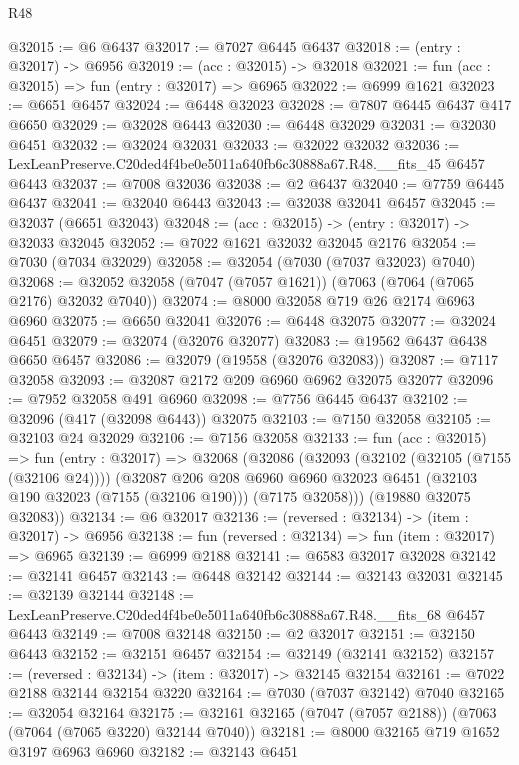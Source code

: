 \begin{lexlean}{R48}
\begin{coremodule}
@32015 := @6 @6437
@32017 := @7027 @6445 @6437
@32018 := (entry : @32017) -> @6956
@32019 := (acc : @32015) -> @32018
@32021 := fun (acc : @32015) => fun (entry : @32017) => @6965
@32022 := @6999 @1621
@32023 := @6651 @6457
@32024 := @6448 @32023
@32028 := @7807 @6445 @6437 @417 @6650
@32029 := @32028 @6443
@32030 := @6448 @32029
@32031 := @32030 @6451
@32032 := @32024 @32031
@32033 := @32022 @32032
@32036 := LexLeanPreserve.C20ded4f4be0e5011a640fb6c30888a67.R48.__fits_45 @6457 @6443
@32037 := @7008 @32036
@32038 := @2 @6437
@32040 := @7759 @6445 @6437
@32041 := @32040 @6443
@32043 := @32038 @32041 @6457
@32045 := @32037 (@6651 @32043)
@32048 := (acc : @32015) -> (entry : @32017) -> @32033 @32045
@32052 := @7022 @1621 @32032 @32045 @2176
@32054 := @7030 (@7034 @32029)
@32058 := @32054 (@7030 (@7037 @32023) @7040)
@32068 := @32052 @32058 (@7047 (@7057 @1621)) (@7063 (@7064 (@7065 @2176) @32032 @7040))
@32074 := @8000 @32058 @719 @26 @2174 @6963 @6960
@32075 := @6650 @32041
@32076 := @6448 @32075
@32077 := @32024 @6451
@32079 := @32074 (@32076 @32077)
@32083 := @19562 @6437 @6438 @6650 @6457
@32086 := @32079 (@19558 (@32076 @32083))
@32087 := @7117 @32058
@32093 := @32087 @2172 @209 @6960 @6962 @32075 @32077
@32096 := @7952 @32058 @491 @6960
@32098 := @7756 @6445 @6437
@32102 := @32096 (@417 (@32098 @6443)) @32075
@32103 := @7150 @32058
@32105 := @32103 @24 @32029
@32106 := @7156 @32058
@32133 := fun (acc : @32015) =>
  fun (entry : @32017) =>
  @32068
    (@32086
      (@32093
        (@32102 (@32105 (@7155 (@32106 @24))))
        (@32087
          @206
          @208
          @6960
          @6960
          @32023
          @6451
          (@32103 @190 @32023 (@7155 (@32106 @190)))
          (@7175 @32058)))
      (@19880 @32075 @32083))
@32134 := @6 @32017
@32136 := (reversed : @32134) -> (item : @32017) -> @6956
@32138 := fun (reversed : @32134) => fun (item : @32017) => @6965
@32139 := @6999 @2188
@32141 := @6583 @32017 @32028
@32142 := @32141 @6457
@32143 := @6448 @32142
@32144 := @32143 @32031
@32145 := @32139 @32144
@32148 := LexLeanPreserve.C20ded4f4be0e5011a640fb6c30888a67.R48.__fits_68 @6457 @6443
@32149 := @7008 @32148
@32150 := @2 @32017
@32151 := @32150 @6443
@32152 := @32151 @6457
@32154 := @32149 (@32141 @32152)
@32157 := (reversed : @32134) -> (item : @32017) -> @32145 @32154
@32161 := @7022 @2188 @32144 @32154 @3220
@32164 := @7030 (@7037 @32142) @7040
@32165 := @32054 @32164
@32175 := @32161 @32165 (@7047 (@7057 @2188)) (@7063 (@7064 (@7065 @3220) @32144 @7040))
@32181 := @8000 @32165 @719 @1652 @3197 @6963 @6960
@32182 := @32143 @6451

\end{coremodule}
\end{lexlean}
